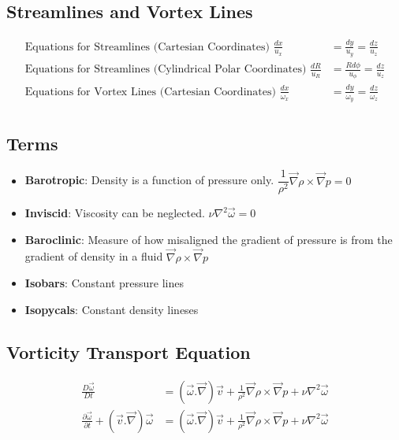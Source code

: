 \documentclass[10pt, letterpaper, notitlepage, landscape]{article}
\begin{document}
\subsection{Streamlines and Vortex Lines}
\begin{align*}
\text{Equations for Streamlines (Cartesian Coordinates) } \frac{dx}{u_x} &= \frac{dy}{u_y} = \frac{dz}{u_z} \\
\text{Equations for Streamlines (Cylindrical Polar Coordinates) } \frac{dR}{u_R} &= \frac{R d \phi}{u_\phi} = \frac{dz}{u_z} \\
\text{Equations for Vortex Lines (Cartesian Coordinates) } \frac{dx}{\omega_x} &= \frac{dy}{\omega_y} = \frac{dz}{\omega_z} \\
\end{align*}

\subsection{Terms}
\begin{itemize}
\item \textbf{Barotropic}: Density is a function of pressure only. $\dfrac{1}{\rho^2} \vec{\nabla} \rho \times \vec{\nabla} p = 0$ 
\item \textbf{Inviscid}: Viscosity can be neglected. $\nu \nabla^2 \vec{\omega} = 0$ 
\item \textbf{Baroclinic}: Measure of how misaligned the gradient of pressure is from the gradient of density in a fluid $\vec{\nabla} \rho \times \vec{\nabla} p$
\item \textbf{Isobars}: Constant pressure lines
\item \textbf{Isopycals}: Constant density lineses
\end{itemize}

\subsection{Vorticity Transport Equation}
\begin{align*}
\frac{D\vec{\omega}}{Dt} &= (\vec{\omega}.\vec{\nabla}) \vec{v} + \frac{1}{\rho^2} \vec{\nabla} \rho \times \vec{\nabla} p + \nu \nabla^2 \vec{\omega} \\
\frac{\partial \vec{\omega}}{\partial t} + (\vec{v}.\vec{\nabla})\vec{\omega} &= (\vec{\omega}.\vec{\nabla}) \vec{v} + \frac{1}{\rho^2} \vec{\nabla} \rho \times \vec{\nabla} p + \nu \nabla^2 \vec{\omega}
\end{align*}
\end{document}
